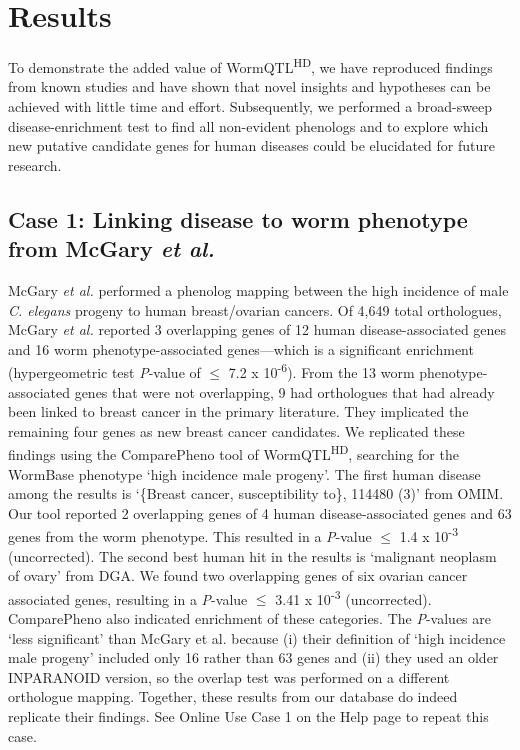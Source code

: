 \section{Results}
To demonstrate the added value of WormQTL\textsuperscript{HD}, we have reproduced findings from known studies and have shown that novel insights and hypotheses can be achieved with little time and effort.
Subsequently, we performed a broad-sweep disease-enrichment test to find all non-evident phenologs and to explore which new putative candidate genes for human diseases could be elucidated for future research.

\subsection[Case 1: McGary \textsl{et al.}]{Case 1: Linking disease to worm phenotype from McGary \textsl{et al.} \cite{McGary_2010}}
McGary \textsl{et al.} performed a phenolog mapping between the high incidence of male \textsl{C. elegans} progeny to human breast/ovarian cancers. Of 4,649 total orthologues, McGary \textsl{et al.} reported 3 overlapping genes of 12 human disease-associated genes and 16 worm phenotype-associated genes—which is a significant enrichment (hypergeometric test \textsl{P}-value of $\leq$ 7.2 x 10\textsuperscript{-6}).
From the 13 worm phenotype-associated genes that were not overlapping, 9 had orthologues that had already been linked to breast cancer in the primary literature.
They implicated the remaining four genes as new breast cancer candidates. We replicated these findings using the ComparePheno tool of WormQTL\textsuperscript{HD}, searching for the WormBase phenotype ‘high incidence male progeny’.
The first human disease among the results is ‘\{Breast cancer, susceptibility to\}, 114480 (3)’ from OMIM. Our tool reported 2 overlapping genes of 4 human disease-associated genes and 63 genes from the worm phenotype.
This resulted in a \textsl{P}-value $\leq$ 1.4 x 10\textsuperscript{-3} (uncorrected). The second best human hit in the results is ‘malignant neoplasm of ovary’ from DGA.
We found two overlapping genes of six ovarian cancer associated genes, resulting in a \textsl{P}-value $\leq$ 3.41 x 10\textsuperscript{-3} (uncorrected).
ComparePheno also indicated enrichment of these categories.
The \textsl{P}-values are ‘less significant’ than McGary et al. because (i) their definition of ‘high incidence male progeny’ included only 16 rather than 63 genes and (ii) they used an older INPARANOID version, so the overlap test was performed on a different orthologue mapping.
Together, these results from our  database do indeed replicate their findings.
See Online Use Case 1 on the Help page to repeat this case.

